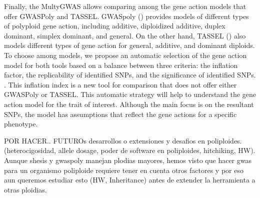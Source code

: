 \documentclass{article}
\begin{document}
Finally, the MultyGWAS allows comparing among the gene action models that offer GWASPoly and TASSEL.  GWASpoly (\cite{Rosyara2016}) provides models of different types of polyploid gene action, including additive, diploidized additive, duplex dominant, simplex dominant, and general. On the other hand, TASSEL (\cite{Bradbury2007}) also models different types of gene action for general, additive, and dominant diploids. To choose among models, we propose an automatic selection of the gene action model for both tools based on a balance between three criteria: the inflation factor, the replicability of identified SNPs, and the significance of identified SNPs. . This inflation index is a new tool for comparison that does not offer either GWASPoly or TASSEL. This automatic strategy will help to understand the gene action model for the trait of interest. Although the main focus is on the resultant SNPs, the model has assumptions that reflect the gene actions for a specific phenotype.

POR HACER..
FUTUROs desarrollos o extensiones y desafios en poliploides.  (heterocigosidad, allele dosage, poder de software en poliploides, hitchiking, HW). Aunque shesis y gwaspoly manejan plodias mayores, hemos visto que hacer gwas para un organismo poliploide requiere tener en cuenta otros factores y por eso aun queremos estudiar esto (HW, Inheritance) antes de extender la herramienta a otras ploidias.

\end{document}
